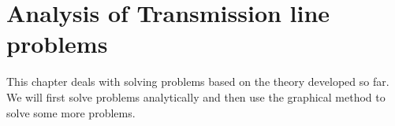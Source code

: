 \chapter{Analysis of Transmission line problems}\label{lec:lec14}
This chapter deals with solving problems based on the theory developed so far. We will first solve problems analytically and then use the graphical method to solve some more problems.